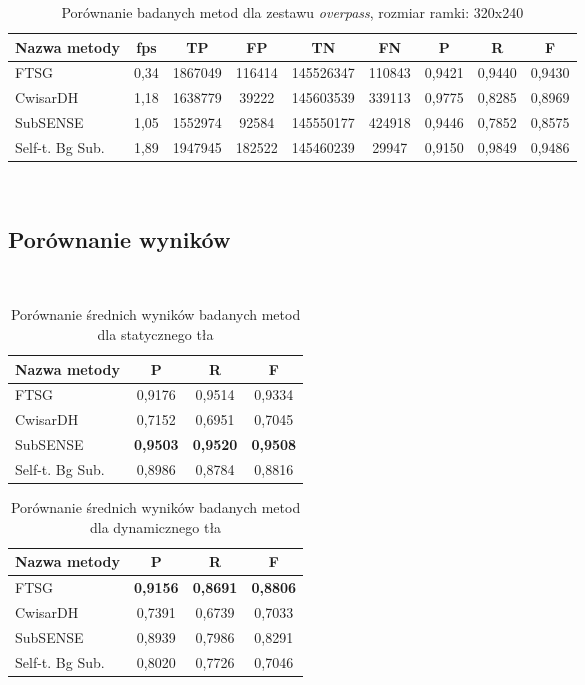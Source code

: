 \begin{table}[!h]
\small
\caption{Porównanie badanych metod dla zestawu \textit{overpass}, rozmiar ramki: 320x240}
\label{tab:resultsOverpass}
\centering
\begin{tabular*}{\textwidth}{@{\extracolsep{\fill}} |l*{8}{|c}|}
  \hline 
  \textbf{Nazwa metody} & \textbf{fps} & \textbf{TP} & \textbf{FP} & \textbf{TN} & \textbf{FN} & \textbf{P} & \textbf{R} & \textbf{F}\\
  \hline
  FTSG & 0,34 & 1867049 & 116414 & 145526347 & 110843 & 0,9421 & 0,9440 & 0,9430\\ 
\hline
  CwisarDH & 1,18 & 1638779 & 39222 & 145603539 & 339113 & 0,9775 & 0,8285 & 0,8969\\ 
\hline
  SubSENSE & 1,05 & 1552974 & 92584 & 145550177 & 424918 & 0,9446 & 0,7852 & 0,8575\\ 
\hline
  Self-t. Bg Sub. & 1,89 & 1947945 & 182522 & 145460239 & 29947 & 0,9150 & 0,9849 & 0,9486\\
  \hline
\end{tabular*}
\end{table}
~
\FloatBarrier
\clearpage
\subsection{Porównanie wyników}
~
\FloatBarrier
\begin{table}[!h]
\small
\caption{Porównanie średnich wyników badanych metod dla statycznego tła}
\label{tab:resultsSt}
\centering
\begin{tabular}{|p{4cm}*{3}{|c}|}
  \hline 
  \textbf{Nazwa metody} & \textbf{P} & \textbf{R} & \textbf{F}\\
  \hline
  FTSG & 0,9176 & 0,9514 & 0,9334 \\
\hline
CwisarDH & 0,7152 & 0,6951 & 0,7045 \\
\hline
SubSENSE & \textbf{0,9503} & \textbf{0,9520} & \textbf{0,9508} \\
\hline
Self-t. Bg Sub. & 0,8986 & 0,8784 & 0,8816 \\
\hline
\end{tabular}
\end{table}

\begin{table}[!h]
\small
\caption{Porównanie średnich wyników badanych metod dla dynamicznego tła}
\label{tab:resultsDyn}
\centering
\begin{tabular}{|p{4cm}*{3}{|c}|}
  \hline 
  \textbf{Nazwa metody} & \textbf{P} & \textbf{R} & \textbf{F}\\
  \hline
  FTSG & \textbf{0,9156} & \textbf{0,8691} & \textbf{0,8806} \\
\hline
CwisarDH & 0,7391 & 0,6739 & 0,7033 \\
\hline
SubSENSE & 0,8939 & 0,7986 & 0,8291 \\
\hline
Self-t. Bg Sub. & 0,8020 & 0,7726 & 0,7046 \\
\hline
\end{tabular}
\end{table}

